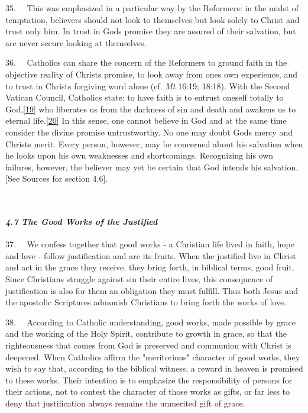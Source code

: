 35.~ ~This was emphasized in a particular way by the Reformers: in the
midst of temptation, believers should not look to themselves but look
solely to Christ and trust only him. In trust in God\textquotesingle s
promise they are assured of their salvation, but are never secure
looking at themselves.

36.~ ~Catholics can share the concern of the Reformers to ground faith
in the objective reality of Christ\textquotesingle s promise, to look
away from one\textquotesingle s own experience, and to trust in
Christ\textquotesingle s forgiving word alone (cf. \emph{Mt} 16:19;
18:18). With the Second Vatican Council, Catholics state: to have faith
is to entrust oneself totally to
God,\label{r19}{}\hyperref[19]{{[}19{]}} who liberates us
from the darkness of sin and death and awakens us to eternal
life.\label{r20}{}\hyperref[20]{{[}20{]}} In this sense,
one cannot believe in God and at the same time consider the divine
promise untrustworthy. No one may doubt God\textquotesingle s mercy and
Christ\textquotesingle s merit. Every person, however, may be concerned
about his salvation when he looks upon his own weaknesses and
shortcomings. Recognizing his own failures, however, the believer may
yet be certain that God intends his salvation. {[}See Sources for
section 4.6{]}.

~

\paragraph{\texorpdfstring{\emph{4.7 The Good Works of the
Justified}}{4.7 The Good Works of the Justified}}\label{the-good-works-of-the-justified}

37.~ ~We confess together that good works - a Christian life lived in
faith, hope and love - follow justification and are its fruits. When the
justified live in Christ and act in the grace they receive, they bring
forth, in biblical terms, good fruit. Since Christians struggle against
sin their entire lives, this consequence of justification is also for
them an obligation they must fulfill. Thus both Jesus and the apostolic
Scriptures admonish Christians to bring forth the works of love.

38.~ ~According to Catholic understanding, good works, made possible by
grace and the working of the Holy Spirit, contribute to growth in grace,
so that the righteousness that comes from God is preserved and communion
with Christ is deepened. When Catholics affirm the "meritorious"
character of good works, they wish to say that, according to the
biblical witness, a reward in heaven is promised to these works. Their
intention is to emphasize the responsibility of persons for their
actions, not to contest the character of those works as gifts, or far
less to deny that justification always remains the unmerited gift of
grace.

